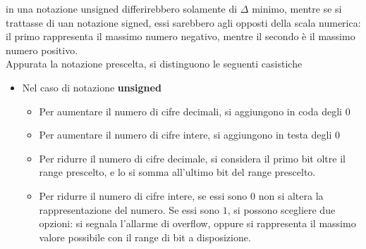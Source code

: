 \documentclass[a4paper]{extarticle}
\begin{document}
\noindent
in una notazione unsigned differirebbero solamente di $\Delta$ minimo, mentre se si trattasse di uan notazione signed, essi sarebbero agli opposti della scala numerica: il primo rappresenta il massimo numero negativo, mentre il secondo è il massimo numero positivo.\\
Appurata la notazione prescelta, si distinguono le seguenti casistiche
\begin{itemize}
    \item Nel caso di notazione \textbf{unsigned}
    \begin{itemize}
        \item Per aumentare il numero di cifre decimali, si aggiungono in coda degli $0$
        \item Per aumentare il numero di cifre intere, si aggiungono in testa degli $0$
        \item Per ridurre il numero di cifre decimale, si considera il primo bit oltre il range prescelto, e lo si somma all'ultimo bit del range prescelto.
        \item Per ridurre il numero di cifre intere, se essi sono $0$ non si altera la rappresentazione del numero. Se essi sono $1$, si possono scegliere due opzioni: si segnala l'allarme di overflow, oppure si rappresenta il massimo valore possibile con il range di bit a disposizione.
    \end{itemize}
    

\end{itemize}
\end{document}
